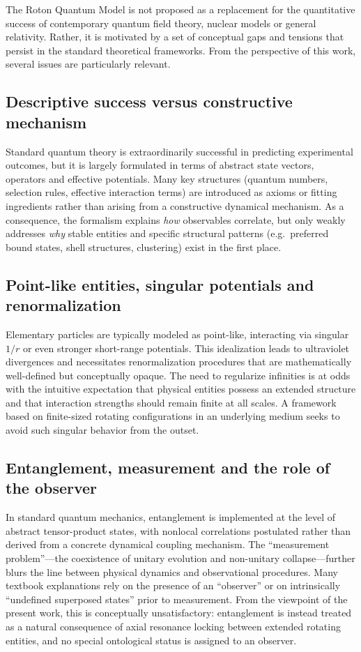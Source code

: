 \documentclass[11pt,a4paper]{article}
\begin{document}
The Roton Quantum Model is not proposed as a replacement for the quantitative success of contemporary quantum field theory, nuclear models or general relativity. Rather, it is motivated by a set of conceptual gaps and tensions that persist in the standard theoretical frameworks. From the perspective of this work, several issues are particularly relevant.

\subsection{Descriptive success versus constructive mechanism}

Standard quantum theory is extraordinarily successful in predicting experimental outcomes, but it is largely formulated in terms of abstract state vectors, operators and effective potentials. Many key structures (quantum numbers, selection rules, effective interaction terms) are introduced as axioms or fitting ingredients rather than arising from a constructive dynamical mechanism. As a consequence, the formalism explains \emph{how} observables correlate, but only weakly addresses \emph{why} stable entities and specific structural patterns (e.g.\ preferred bound states, shell structures, clustering) exist in the first place.

\subsection{Point-like entities, singular potentials and renormalization}

Elementary particles are typically modeled as point-like, interacting via singular $1/r$ or even stronger short-range potentials. This idealization leads to ultraviolet divergences and necessitates renormalization procedures that are mathematically well-defined but conceptually opaque. The need to regularize infinities is at odds with the intuitive expectation that physical entities possess an extended structure and that interaction strengths should remain finite at all scales. A framework based on finite-sized rotating configurations in an underlying medium seeks to avoid such singular behavior from the outset.

\subsection{Entanglement, measurement and the role of the observer}

In standard quantum mechanics, entanglement is implemented at the level of abstract tensor-product states, with nonlocal correlations postulated rather than derived from a concrete dynamical coupling mechanism. The ``measurement problem''---the coexistence of unitary evolution and non-unitary collapse---further blurs the line between physical dynamics and observational procedures. Many textbook explanations rely on the presence of an ``observer'' or on intrinsically ``undefined superposed states'' prior to measurement. From the viewpoint of the present work, this is conceptually unsatisfactory: entanglement is instead treated as a natural consequence of axial resonance locking between extended rotating entities, and no special ontological status is assigned to an observer.
\end{document}

